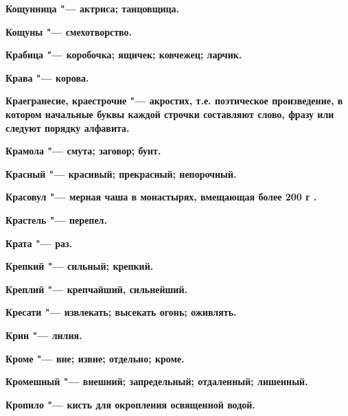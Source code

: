 \bfseries Кощунница \normalfont{} "--- актриса; танцовщица. 




\bfseries Кощуны \normalfont{} "--- смехотворство. 




\bfseries Крабица \normalfont{} "--- коробочка; ящичек; ковчежец; ларчик. 




\bfseries Крава \normalfont{} "--- корова. 




\bfseries Краегранесие, краестрочие \normalfont{} "--- акростих, т.е. поэтическое произведение, в котором начальные буквы каждой строчки составляют слово, фразу или следуют порядку алфавита. 




\bfseries Крамола \normalfont{} "--- смута; заговор; бунт. 




\bfseries Красный \normalfont{} "--- красивый; прекрасный; непорочный. 




\bfseries Красовул \normalfont{} "--- мерная чаша в монастырях, вмещающая более 200 г . 




\bfseries Крастель \normalfont{} "--- перепел. 




\bfseries Крата \normalfont{} "--- раз. 




\bfseries Крепкий \normalfont{} "--- сильный; крепкий. 




\bfseries Креплий \normalfont{} "--- крепчайший, сильнейший. 




\bfseries Кресати \normalfont{} "--- извлекать; высекать огонь; оживлять. 




\bfseries Крин \normalfont{} "--- лилия. 




\bfseries Кроме \normalfont{} "--- вне; извне; отдельно; кроме. 




\bfseries Кромешный \normalfont{} "--- внешний; запредельный; отдаленный; лишенный. 




\bfseries Кропило \normalfont{} "--- кисть для окропления освященной водой. 




